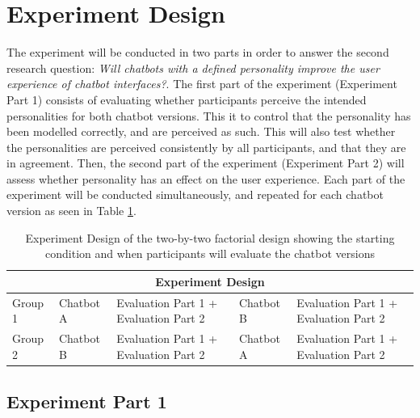 \vspace{5mm} %
    
\section{Experiment Design}
    \label{experimentdesign}

The experiment will be conducted in two parts in order to answer the second research question: \textit{Will chatbots with a defined personality improve the user experience of chatbot interfaces?}. The first part of the experiment (Experiment Part 1) consists of evaluating whether participants perceive the intended personalities for both chatbot versions. This it to control that the personality has been modelled correctly, and are perceived as such. This will also test whether the personalities are perceived consistently by all participants, and that they are in agreement. Then, the second part of the experiment (Experiment Part 2) will assess whether personality has an effect on the user experience. Each part of the experiment will be conducted simultaneously, and repeated for each chatbot version as seen in Table \ref{table:expdes}.

\vspace{2,5mm}

  \begin{table}[h]
  \centering
    \begin{tabular}{ |p{}||p{}||p{4cm}||p{}||p{4cm}| }
    \hline
    \multicolumn{5}{|c|}{Experiment Design} \\
    \hline
    Group 1 &   Chatbot A & Evaluation Part 1 + Evaluation Part 2 & Chatbot B & Evaluation Part 1 + Evaluation Part 2 \\
    \hline   
    Group 2 &   Chatbot B & Evaluation Part 1 + Evaluation Part 2 & Chatbot A & Evaluation Part 1 + Evaluation Part 2 \\
    \hline
    \end{tabular}
    \caption{Experiment Design of the two-by-two factorial design showing the starting condition and when participants will evaluate the chatbot versions}
    \label{table:expdes}
    \end{table}
    
\vspace{2,5mm}

\subsection{Experiment Part 1}

